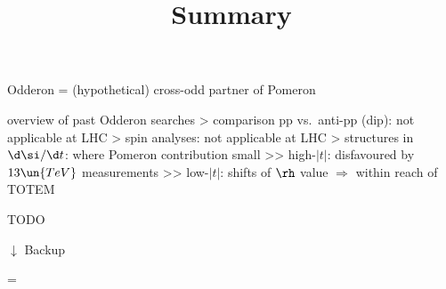 \newpage %

\> Odderon = (hypothetical) cross-odd partner of Pomeron

\> overview of past Odderon searches
\>> comparison pp vs.~anti-pp (dip): not applicable at LHC
\>> spin analyses: not applicable at LHC
\>> structures in $\d\si / \d t$: where Pomeron contribution small
\>>> high-$|t|$: disfavoured by $13\un{TeV}$ measurements
\>>> low-$|t|$: shifts of $\rh$ value $\Rightarrow$ within reach of TOTEM




\newpage %
\title{Summary}

TODO


\newpage %
\hbox{}%
\vfill
\centerline{ $\downarrow$ Backup}
\footline={}


\iffalse
\newpage %
\title{Backup topics}

\> Optics refinement with RP data

\> Coulomb analysis
\>> interference formulae
\>> phase choices

\fi

\newpage %
\centerline{}

\newpage %
\centerline{}

\newpage %
\centerline{}

\newpage %
\centerline{}

\vfil
\eject
\bye

